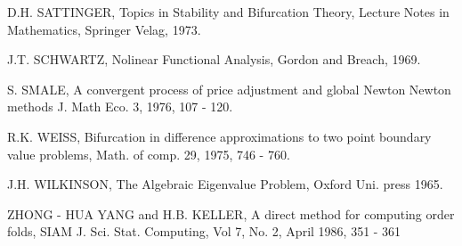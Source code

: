 \begin{thebibliography}{99}
 {D.H. SATTINGER,} Topics in Stability and Bifurcation
  Theory, Lecture Notes in Mathematics, Springer Velag, 1973. 

 { J.T. SCHWARTZ,} Nolinear Functional Analysis, Gordon
  and Breach, 1969. 

 {S. SMALE,} A convergent process of price adjustment and
  global Newton Newton methods J. Math Eco. 3, 1976, 107 - 120. 

 {R.K. WEISS,} Bifurcation in difference approximations to
  two point boundary value problems, Math. of comp. 29, 1975, 746 -
  760. 

 {J.H. WILKINSON,} The Algebraic Eigenvalue Problem, 
  Oxford Uni. press 1965. 

 {ZHONG - HUA YANG and H.B. KELLER,} A direct method for
  computing order folds, SIAM J. Sci. Stat. Computing, Vol 7,
  No. 2, April 1986, 351 - 361   
\end{thebibliography}
